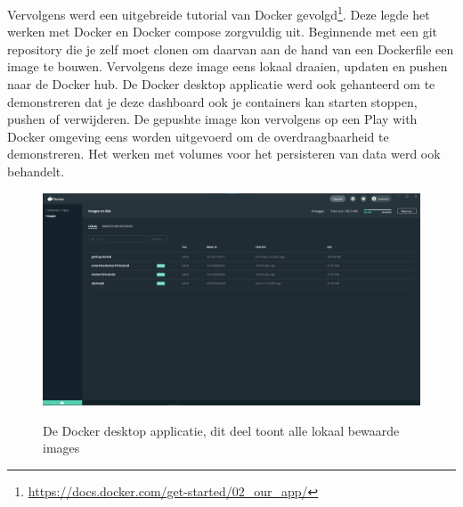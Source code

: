 Vervolgens werd een uitgebreide tutorial van Docker gevolgd\footnote{\url{https://docs.docker.com/get-started/02_our_app/}}. Deze legde het werken met Docker en Docker compose zorgvuldig uit. Beginnende met een git repository die je zelf moet clonen om daarvan aan de hand van een Dockerfile een image te bouwen. Vervolgens deze image eens lokaal draaien, updaten en pushen naar de Docker hub. De Docker desktop applicatie werd ook gehanteerd om te demonstreren dat je deze dashboard ook je containers kan starten stoppen, pushen of verwijderen. De gepushte image kon vervolgens op een Play with Docker omgeving eens worden uitgevoerd om de overdraagbaarheid te demonstreren. Het werken met volumes voor het persisteren van data werd ook behandelt. 

\begin{figure}[h]
    \includegraphics[width=\linewidth]{img/dockerImg.png}
    \label{fig:Dockerdesktop}
    \caption[De Docker desktop applicatie]{De Docker desktop applicatie, dit deel toont alle lokaal bewaarde images}
    \centering
\end{figure}
